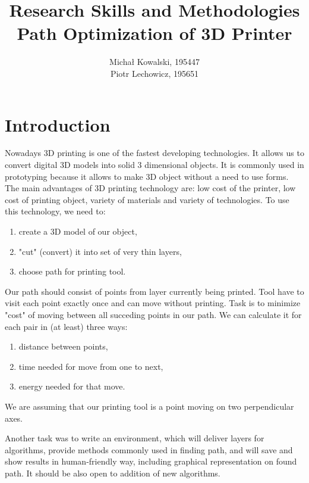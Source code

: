 \documentclass[]{article}
\title{Research Skills and Methodologies\\Path Optimization of 3D Printer}
\author{Michał Kowalski, 195447\\Piotr Lechowicz, 195651}
\date{}
\begin{document}
\maketitle
\pagebreak

\section{Introduction}
Nowadays 3D printing is one of the fastest developing technologies. It allows us to convert digital 3D models into solid 3 dimensional objects. It is commonly used in prototyping because it allows to make 3D object without a need to use forms. The main advantages of 3D printing technology are: low cost of the printer, low cost of printing object, variety of materials and variety of technologies.
To use this technology, we need to:
\begin{enumerate}
\item create a 3D model of our object,
\item "cut" (convert) it into set of very thin layers,
\item choose path for printing tool.
\end{enumerate}
Our path should consist of points from layer currently being printed. Tool have to visit each point exactly once and can move without printing. Task is to minimize "cost" of moving between all succeding points in our path. We can calculate it for each pair in (at least) three ways:
\begin{enumerate}
\item distance between points,
\item time needed for move from one to next,
\item energy needed for that move.
\end{enumerate}
We are assuming that our printing tool is a point moving on two perpendicular axes.

Another task was to write an environment, which will deliver layers for algorithms, provide methods commonly used in finding path, and will save and show results in human-friendly way, including graphical representation on found path. It should be also open to addition of new algorithms.

\pagebreak
\end{document}
